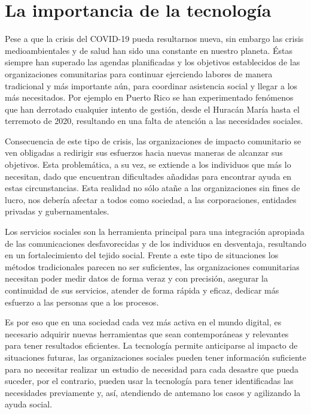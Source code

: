 \section{La importancia de la tecnología}
Pese a que la crisis del COVID-19 pueda resultarnos nueva, sin embargo las crisis medioambientales y de salud han sido una constante en nuestro planeta. Éstas siempre han superado las agendas planificadas y los objetivos establecidos de las organizaciones comunitarias para continuar ejerciendo labores de manera tradicional y más importante aún, para coordinar asistencia social y llegar a los más necesitados. Por ejemplo en Puerto Rico se han experimentado fenómenos que han derrotado cualquier intento de gestión, desde el Huracán María hasta el terremoto de 2020, resultando en una falta de atención a las necesidades sociales.
\vspace{1em}
\par Consecuencia de este tipo de crisis, las organizaciones de impacto comunitario se ven obligadas a redirigir sus esfuerzos hacia nuevas maneras de alcanzar sus objetivos. Esta problemática, a su vez, se extiende a los individuos que más lo necesitan, dado que encuentran dificultades añadidas para encontrar ayuda en estas circunstancias.
\clearpage
Esta realidad no sólo atañe a las organizaciones sin fines de lucro, nos debería afectar a todos como sociedad, a las corporaciones, entidades privadas y gubernamentales.
\vspace{1em}
\par Los servicios sociales son la herramienta principal para una integración apropiada de las comunicaciones desfavorecidas y de los individuos en desventaja, resultando en un fortalecimiento del tejido social. Frente a este tipo de situaciones los métodos tradicionales parecen no ser suficientes, las organizaciones comunitarias necesitan poder medir datos de forma veraz y con precisión, asegurar la continuidad de sus servicios, atender de forma rápida y eficaz, dedicar más esfuerzo a las personas que a los procesos.
\vspace{1em}
\par Es por eso que en una sociedad cada vez más activa en el mundo digital, es necesario adquirir nuevas herramientas que sean contemporáneas y relevantes para tener resultados eficientes. La tecnología permite anticiparse al impacto de situaciones futuras, las organizaciones sociales pueden tener información suficiente para no necesitar realizar un estudio de necesidad para cada desastre que pueda suceder, por el contrario, pueden usar la tecnología para tener identificadas las necesidades previamente y, así, atendiendo de antemano los casos y agilizando la ayuda social.
